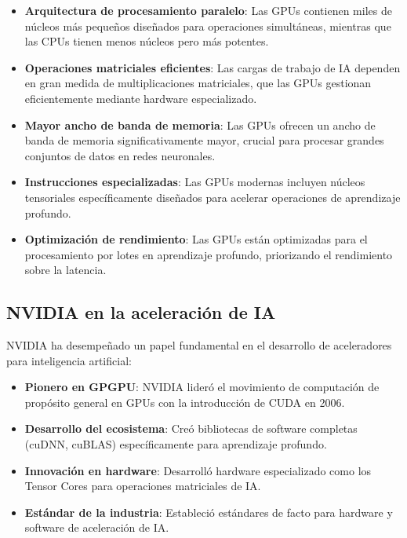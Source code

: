 \documentclass[11pt,spanish,listoffigures,listoftables]{tfgetsinf}
\begin{document}
\begin{itemize}
   \item \textbf{Arquitectura de procesamiento paralelo}: Las GPUs contienen miles de núcleos más pequeños diseñados para operaciones simultáneas, mientras que las CPUs tienen menos núcleos pero más potentes.
   
   \item \textbf{Operaciones matriciales eficientes}: Las cargas de trabajo de IA dependen en gran medida de multiplicaciones matriciales, que las GPUs gestionan eficientemente mediante hardware especializado.
   
   \item \textbf{Mayor ancho de banda de memoria}: Las GPUs ofrecen un ancho de banda de memoria significativamente mayor, crucial para procesar grandes conjuntos de datos en redes neuronales.
   
   \item \textbf{Instrucciones especializadas}: Las GPUs modernas incluyen núcleos tensoriales específicamente diseñados para acelerar operaciones de aprendizaje profundo.
   
   \item \textbf{Optimización de rendimiento}: Las GPUs están optimizadas para el procesamiento por lotes en aprendizaje profundo, priorizando el rendimiento sobre la latencia.
\end{itemize}

\subsection{NVIDIA en la aceleración de IA}
NVIDIA ha desempeñado un papel fundamental en el desarrollo de aceleradores para inteligencia artificial:

\begin{itemize}
   \item \textbf{Pionero en GPGPU}: NVIDIA lideró el movimiento de computación de propósito general en GPUs con la introducción de CUDA en 2006.
   
   \item \textbf{Desarrollo del ecosistema}: Creó bibliotecas de software completas (cuDNN, cuBLAS) específicamente para aprendizaje profundo.
   
   \item \textbf{Innovación en hardware}: Desarrolló hardware especializado como los Tensor Cores para operaciones matriciales de IA.
   
   \item \textbf{Estándar de la industria}: Estableció estándares de facto para hardware y software de aceleración de IA.
\end{itemize}
\end{document}
